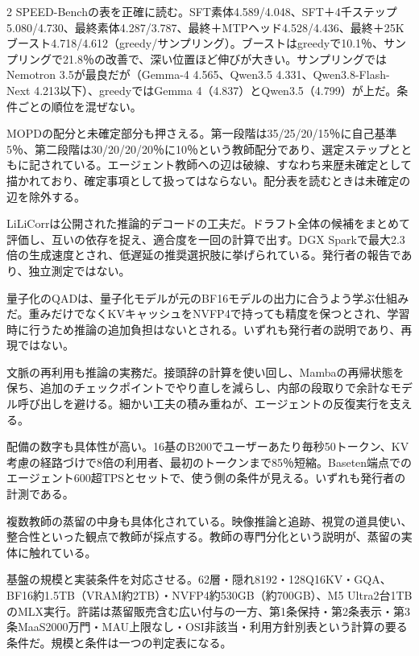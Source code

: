 \documentclass[lualatex,a4paper,10pt]{jlreq}
\begin{document}
\begin{multicols}{2}
SPEED-Benchの表を正確に読む。SFT素体4.589/4.048、SFT＋4千ステップ5.080/4.730、最終素体4.287/3.787、最終＋MTPヘッド4.528/4.436、最終＋25Kブースト4.718/4.612（greedy/サンプリング）。ブーストはgreedyで10.1％、サンプリングで21.8％の改善で、深い位置ほど伸びが大きい。サンプリングではNemotron 3.5が最良だが（Gemma-4 4.565、Qwen3.5 4.331、Qwen3.8-Flash-Next 4.213以下）、greedyではGemma 4（4.837）とQwen3.5（4.799）が上だ。条件ごとの順位を混ぜない。
\cite{B21,B72,B22,B20,B60}


MOPDの配分と未確定部分も押さえる。第一段階は35/25/20/15％に自己基準5％、第二段階は30/20/20/20％に10％という教師配分であり、選定ステップとともに記されている。エージェント教師への辺は破線、すなわち来歴未確定として描かれており、確定事項として扱ってはならない。配分表を読むときは未確定の辺を除外する。
\cite{B21,B72,B22,B20}


LiLiCorrは公開された推論的デコードの工夫だ。ドラフト全体の候補をまとめて評価し、互いの依存を捉え、適合度を一回の計算で出す。DGX Sparkで最大2.3倍の生成速度とされ、低遅延の推奨選択肢に挙げられている。発行者の報告であり、独立測定ではない。
\cite{B21,B72,B22,B20}


量子化のQADは、量子化モデルが元のBF16モデルの出力に合うよう学ぶ仕組みだ。重みだけでなくKVキャッシュをNVFP4で持っても精度を保つとされ、学習時に行うため推論の追加負担はないとされる。いずれも発行者の説明であり、再現ではない。
\cite{B21,B72,B22,B20}


文脈の再利用も推論の実務だ。接頭辞の計算を使い回し、Mambaの再帰状態を保ち、追加のチェックポイントでやり直しを減らし、内部の段取りで余計なモデル呼び出しを避ける。細かい工夫の積み重ねが、エージェントの反復実行を支える。
\cite{B21,B72,B22,B20}


配備の数字も具体性が高い。16基のB200でユーザーあたり毎秒50トークン、KV考慮の経路づけで8倍の利用者、最初のトークンまで85％短縮。Baseten端点でのエージェント600超TPSとセットで、使う側の条件が見える。いずれも発行者の計測である。
\cite{B21,B72,B22,B20}


複数教師の蒸留の中身も具体化されている。映像推論と追跡、視覚の道具使い、整合性といった観点で教師が採点する。教師の専門分化という説明が、蒸留の実体に触れている。
\cite{B21,B72,B22,B20}


基盤の規模と実装条件を対応させる。62層・隠れ8192・128Q16KV・GQA、BF16約1.5TB（VRAM約2TB）・NVFP4約530GB（約700GB）、M5 Ultra2台1TBのMLX実行。許諾は蒸留販売含む広い付与の一方、第1条保持・第2条表示・第3条MaaS2000万門・MAU上限なし・OSI非該当・利用方針別表という計算の要る条件だ。規模と条件は一つの判定表になる。
\cite{B14,B70,B15,B13,B71}



\end{multicols}
\end{document}
